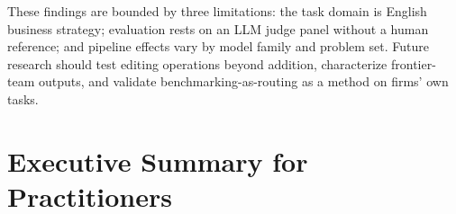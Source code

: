 \documentclass[12pt,a4paper]{article}
\begin{document}
These findings are bounded by three limitations: the task domain is English
business strategy; evaluation rests on an LLM judge panel without a human
reference; and pipeline effects vary by model family and problem set. Future
research should test editing operations beyond addition, characterize
frontier-team outputs, and validate benchmarking-as-routing as a method on
firms' own tasks.

\clearpage
\appendix

\section{Executive Summary for Practitioners}\label{sec:exec-summary}
\end{document}

